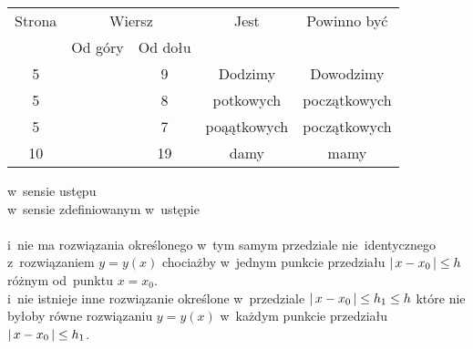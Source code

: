 \documentclass[a4paper,11pt]{article}
\begin{document}
\begin{center}

  \begin{tabular}{|c|c|c|c|c|}
    \hline
    Strona & \multicolumn{2}{c|}{Wiersz} & Jest
                              & Powinno być \\ \cline{2-3}
    & Od góry & Od dołu & & \\
    \hline
    5   & &  9 & Dodzimy & Dowodzimy \\
    5   & &  8 & potkowych & początkowych \\
    5   & &  7 & poąątkowych & początkowych \\
    10  & & 19 & damy & mamy \\
    \hline
  \end{tabular}

\end{center}

\vspace{\VerSpaceSix}


\noindent
{}
\Jest  w~sensie ustępu \\
\Powin w~sensie zdefiniowanym w~ustępie \\
 \\
\Jest  i~nie ma rozwiązania określonego w~tym samym przedziale
nie~identycznego z~rozwiązaniem $y = y( x )$ chociażby w~jednym
punkcie przedziału $|\, {  x - x_{ 0 }  } \,| \leq h$ różnym
od~punktu $x = x_{ 0 }$. \\
\Powin i~nie istnieje inne rozwiązanie określone w~przedziale
$|\, {  x - x_{ 0 }  } \,| \leq h_{ 1 } \leq h$ które nie byłoby równe
rozwiązaniu $y = y( x )$ w~każdym punkcie przedziału
$|\, {  x - x_{ 0 }  } \,| \leq h_{ 1 }$. \\












\newpage


\vspace{0em}
\end{document}

